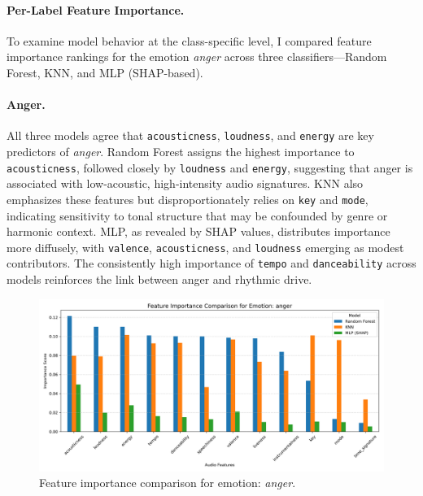 \documentclass{article}
\begin{document}
\paragraph{Per-Label Feature Importance.}
To examine model behavior at the class-specific level, I compared feature importance rankings for the emotion \textit{anger} across three classifiers—Random Forest, KNN, and MLP (SHAP-based).

\paragraph{Anger.}
All three models agree that \texttt{acousticness}, \texttt{loudness}, and \texttt{energy} are key predictors of \textit{anger}. Random Forest assigns the highest importance to \texttt{acousticness}, followed closely by \texttt{loudness} and \texttt{energy}, suggesting that anger is associated with low-acoustic, high-intensity audio signatures. KNN also emphasizes these features but disproportionately relies on \texttt{key} and \texttt{mode}, indicating sensitivity to tonal structure that may be confounded by genre or harmonic context. MLP, as revealed by SHAP values, distributes importance more diffusely, with \texttt{valence}, \texttt{acousticness}, and \texttt{loudness} emerging as modest contributors. The consistently high importance of \texttt{tempo} and \texttt{danceability} across models reinforces the link between anger and rhythmic drive.

\begin{figure}[H]
\centering
\includegraphics[width=\linewidth]{Graphics/per_label/anger_feature_importance.png}
\caption{Feature importance comparison for emotion: \textit{anger}.}
\label{fig:shap_anger}
\end{figure}
\end{document}
